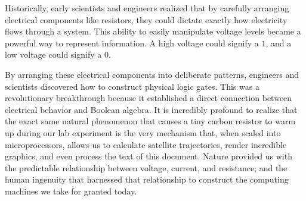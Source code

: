 \documentclass[12pt]{article}
\begin{document}
Historically, early scientists and engineers realized that by carefully
arranging electrical components like resistors, they could dictate exactly how
electricity flows through a system. This ability to easily manipulate voltage
levels became a powerful way to represent information. A high voltage could
signify a $1$, and a low voltage could signify a $0$.

By arranging these electrical components into deliberate patterns, engineers and
scientists discovered how to construct physical logic gates. This was a
revolutionary breakthrough because it established a direct connection between
electrical behavior and Boolean algebra. It is incredibly profound to realize
that the exact same natural phenomenon that causes a tiny carbon resistor to
warm up during our lab experiment is the very mechanism that, when scaled into
microprocessors, allows us to calculate satellite trajectories, render
incredible graphics, and even process the text of this document. Nature provided
us with the predictable relationship between voltage, current, and resistance;
and the human ingenuity that harnessed that relationship to construct the computing
machines we take for granted today.
\end{document}
